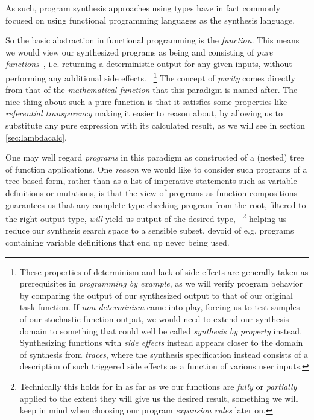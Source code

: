 \documentclass{article}
\begin{document}
As such, program synthesis approaches using types have in fact commonly focused on using functional programming languages as the synthesis language.%
~\citep{synquid,eguchi2018automated,scythe,scout,gissurarson2018suggesting,idris,lenses}

So the basic abstraction in functional programming is the \emph{function}.
This means we would view our synthesized programs as being and consisting of \emph{pure functions}~\citep{fortran95},
i.e. returning a deterministic output for any given inputs,
without performing any additional side effects.%
~\footnote{
    These properties of determinism and lack of side effects are generally taken as prerequisites in \emph{programming by example},
    as we will verify program behavior by comparing the output of our synthesized output to that of our original task function.
    If \emph{non-determinism} came into play,
    forcing us to test samples of our stochastic function output,
    we would need to extend our synthesis domain to something that could well be called \emph{synthesis by property} instead.
    Synthesizing functions with \emph{side effects} instead appears closer to the domain of synthesis from \emph{traces},
    where the synthesis specification instead consists of a description of such triggered side effects as a function of various user inputs.
}
The concept of \emph{purity} comes directly from that of the \emph{mathematical function} that this paradigm is named after.
The nice thing about such a pure function is that it satisfies some properties like \emph{referential transparency} making it easier to reason about,
by allowing us to substitute any pure expression with its calculated result,
as we will see in section \ref{sec:lambdacalc}.

One may well regard \emph{programs} in this paradigm as constructed of a (nested) tree of function applications.
One \emph{reason} we would like to consider such programs of a tree-based form,
rather than as a list of imperative statements such as variable definitions or mutations,
is that the view of programs as function compositions guarantees us that any complete type-checking program from the root,
filtered to the right output type,
\emph{will} yield us output of the desired type,%
~\footnote{
    Technically this holds for in as far as we our functions are \emph{fully} or \emph{partially} applied to the extent they will give us the desired result,
    something we will keep in mind when choosing our program \emph{expansion rules} later on.
}
helping us reduce our synthesis search space to a sensible subset,
devoid of e.g. programs containing variable definitions that end up never being used.
\end{document}
